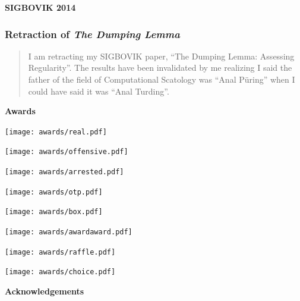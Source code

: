 \documentclass{beamer}
\begin{document}
\begin{frame}
\centering
\Huge \textbf{SIGBOVIK 2014}
\end{frame}

\begin{frame}
\frametitle{Retraction of \emph{The Dumping Lemma}}
\begin{quote}
I am retracting my SIGBOVIK paper, ``The Dumping Lemma: Assessing Regularity''.
The results have been invalidated by me realizing I said the father of the field
of Computational Scatology was ``Anal P\" uring'' when I could have said it was
``Anal Turding''.
\end{quote}
\end{frame}

\begin{frame}
\Huge \textbf{Awards}
\end{frame}

\begin{frame}
\texttt{[image: awards/real.pdf]}
\end{frame}
\begin{frame}
\texttt{[image: awards/offensive.pdf]}
\end{frame}
\begin{frame}
\texttt{[image: awards/arrested.pdf]}
\end{frame}
\begin{frame}
\texttt{[image: awards/otp.pdf]}
\end{frame}
\begin{frame}
\texttt{[image: awards/box.pdf]}
\end{frame}
\begin{frame}
\texttt{[image: awards/awardaward.pdf]}
\end{frame}
\begin{frame}
\texttt{[image: awards/raffle.pdf]}
\end{frame}
\begin{frame}
\texttt{[image: awards/choice.pdf]}
\end{frame}


\begin{frame}
\Huge \textbf{Acknowledgements}
\end{frame}
\end{document}
